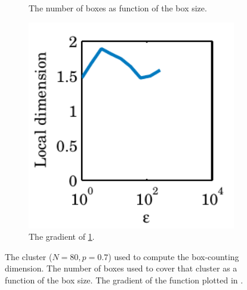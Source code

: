\begin{figure}
\begin{subfigure}[t]{0.3\textwidth}
		\caption{The number of boxes as function of the box size.}
		\label{fig:exp_fractal:fractalDimension}	
	\end{subfigure}	
	\begin{subfigure}[t]{0.3\textwidth}
		\centering
		\includegraphics[width=1\textwidth]{./img/assignment_fractal_gradient}
		\caption{The gradient of \cref{fig:exp_fractal:fractalDimension}.}
		\label{fig:exp_fractal:fractalDimensionGradient}
	\end{subfigure}		
	\caption{ The cluster ($N = 80, p = 0.7$) used to compute the box-counting dimension.  The number of boxes used to cover that cluster as a function of the box size.  The gradient of the function plotted in .}
	\label{fig:exp:dimension:plaatjes}
\end{figure}

